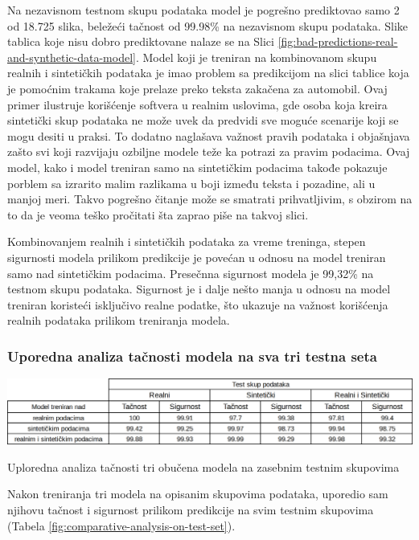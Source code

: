 \documentclass[a4paper,12pt]{article}
\begin{document}
	Na nezavisnom testnom skupu podataka model je pogrešno prediktovao samo 2 od 18.725 slika, beležeći tačnost od 99.98\% na nezavisnom skupu podataka. Slike tablica koje nisu dobro prediktovane nalaze se na Slici \ref{fig:bad-predictions-real-and-synthetic-data-model}. Model koji je treniran na kombinovanom skupu realnih i sintetičkih podataka je imao problem sa predikcijom na slici tablice koja je pomoćnim trakama koje prelaze preko teksta zakačena za automobil. Ovaj primer ilustruje korišćenje softvera u realnim uslovima, gde osoba koja kreira sintetički skup podataka ne može uvek da predvidi sve moguće scenarije koji se mogu desiti u praksi. To dodatno naglašava važnost pravih podataka i objašnjava zašto svi koji razvijaju ozbiljne modele teže ka potrazi za pravim podacima. Ovaj model, kako i model treniran samo na sintetičkim podacima takođe pokazuje porblem sa izrarito malim razlikama u boji između teksta i pozadine, ali u manjoj meri. Takvo pogrešno čitanje može se smatrati prihvatljivim, s obzirom na to da je veoma teško pročitati šta zaprao piše na takvoj slici.
	
	Kombinovanjem realnih i sintetičkih podataka za vreme treninga, stepen sigurnosti modela prilikom predikcije je povećan u odnosu na model treniran samo nad sintetičkim podacima. Presečnna sigurnost modela je 99,32\% na testnom skupu podataka. Sigurnost je i dalje nešto manja u odnosu na model treniran koristeći isključivo realne podatke, što ukazuje na važnost korišćenja realnih podataka prilikom treniranja modela.
	
	\subsubsection{Uporedna analiza tačnosti modela na sva tri testna seta}
	
	\begin{table}[H]
		\centering
		\includegraphics[width=\textwidth]{assets/comparative-analysis-on-test-set.png}
		\caption{Uploredna analiza tačnosti tri obučena modela na zasebnim testnim skupovima}
		\label{fig:comparative-analysis-on-test-set}
	\end{table}

	Nakon treniranja tri modela na opisanim skupovima podataka, uporedio sam njihovu tačnost i sigurnost prilikom predikcije na svim testnim skupovima (Tabela \ref{fig:comparative-analysis-on-test-set}).
	
\end{document}
